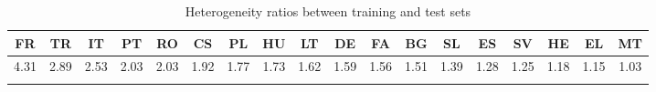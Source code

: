 \documentclass[output=paper
,modfonts
,nonflat,draftmode]{langsci/langscibook}
\begin{document}
\begin{table}
\caption{\label{tbl:homogeneity}Heterogeneity ratios between training and test sets}

{\scriptsize{}}%
\setlength\tabcolsep{3.0pt} %
\renewcommand{\arraystretch}{0.65} %
\begin{tabular}{cccccccccccccccccc}
\lsptoprule 
{\scriptsize{}FR} & {\scriptsize{}TR} & {\scriptsize{}IT} & {\scriptsize{}PT} & {\scriptsize{}RO} & {\scriptsize{}CS} & {\scriptsize{}PL} & {\scriptsize{}HU} & {\scriptsize{}LT} & {\scriptsize{}DE} & {\scriptsize{}FA} & {\scriptsize{}BG} & {\scriptsize{}SL} & {\scriptsize{}ES} & {\scriptsize{}SV} & {\scriptsize{}HE} & {\scriptsize{}EL} & {\scriptsize{}MT}\tabularnewline
\midrule
{\scriptsize{}4.31} & {\scriptsize{}2.89} & {\scriptsize{}2.53} & {\scriptsize{}2.03} & {\scriptsize{}2.03} & {\scriptsize{}1.92} & {\scriptsize{}1.77} & {\scriptsize{}1.73} & {\scriptsize{}1.62} & {\scriptsize{}1.59} & {\scriptsize{}1.56} & {\scriptsize{}1.51} & {\scriptsize{}1.39} & {\scriptsize{}1.28} & {\scriptsize{}1.25} & {\scriptsize{}1.18} & {\scriptsize{}1.15} & {\scriptsize{}1.03}\tabularnewline
\lspbottomrule
\end{tabular}

\end{table}
\end{document}
